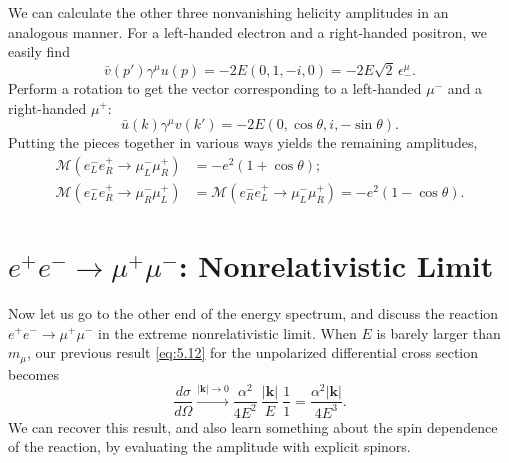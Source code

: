 We can calculate the other three nonvanishing helicity amplitudes in an
analogous manner.  For a left-handed electron and a right-handed positron, we
easily find
\begin{equation}
  \bar{v}(p')\gamma^\mu u(p) = -2E(0, 1, -i, 0) = -2E\sqrt{2}\,\epsilon^{\mu}_{-} .
\end{equation}
Perform a rotation to get the vector corresponding to a left-handed
$\mu^{-}$ and a right-handed $\mu^{+}$:
\begin{equation}
  \bar{u}(k)\gamma^\mu v(k') = -2E(0, \cos\theta, i, -\sin\theta) .
\end{equation}
Putting the pieces together in various ways yields the remaining amplitudes,
\begin{equation}
  \begin{aligned}
    \mathcal{M}(e^{-}_L e^{+}_R \to \mu^{-}_L\mu^{+}_R) &= -e^2(1+\cos\theta);\\
    \mathcal{M}(e^{-}_L e^{+}_R \to \mu^{-}_R\mu^{+}_L) &=
    \mathcal{M}(e^{-}_R e^{+}_L \to \mu^{-}_L\mu^{+}_R) = -e^2(1-\cos\theta).
  \end{aligned}
  \label{eq:5.32}
\end{equation}

\section{$e^{+}e^{-}\to\mu^{+}\mu^{-}$: Nonrelativistic Limit}

Now let us go to the other end of the energy spectrum, and discuss the
reaction $e^{+}e^{-}\to\mu^{+}\mu^{-}$ in the extreme nonrelativistic limit.
When $E$ is barely larger than $m_\mu$, our previous result \eqref{eq:5.12}
for the unpolarized differential cross section becomes
\begin{equation}
  \frac{d\sigma}{d\Omega} \xrightarrow{|\mathbf{k}|\to 0}
    \frac{\alpha^2}{4E^2}\ \frac{|\mathbf{k}|}{E}\ \frac{1}{1}
    = \frac{\alpha^2|\mathbf{k}|}{4E^3} .
  \label{eq:5.33}
\end{equation}
We can recover this result, and also learn something about the spin dependence
of the reaction, by evaluating the amplitude with explicit spinors.

